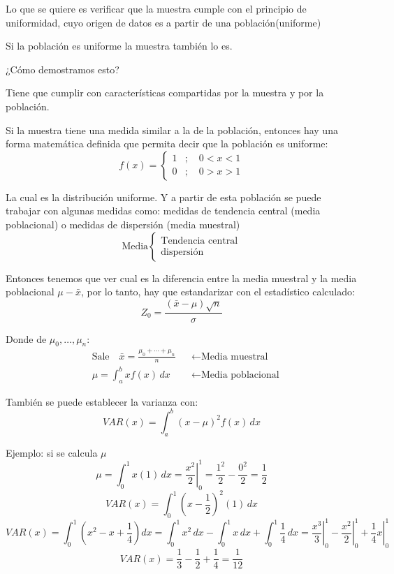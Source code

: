 \documentclass[11pt,letterpaper]{report}
\begin{document}
Lo que se quiere es verificar que la muestra cumple con el principio de uniformidad, cuyo origen de datos es a partir de una población(uniforme)

Si la población es uniforme la muestra también lo es.

¿Cómo demostramos esto?

Tiene que cumplir con características compartidas por la muestra y por la población.

\begin{center}
\end{center}

Si la muestra tiene una medida similar a la de la población, entonces hay una forma matemática definida que permita decir que la población es uniforme:
\[
f(x) = \begin{cases}
1 & ;\quad 0 < x < 1\\
0 & ;\quad 0 > x > 1
\end{cases}
\]

La cual es la distribución uniforme. Y a partir de esta población se puede trabajar con algunas medidas como: medidas de tendencia central (media poblacional) o medidas de dispersión (media muestral)
\[
\text{Media}
\begin{cases}
\text{Tendencia central}\\
\text{dispersión}
\end{cases}
\]

Entonces tenemos que ver cual es la diferencia entre la media muestral y la media poblacional $\mu - \bar{x}$, por lo tanto, hay que estandarizar con el estadístico calculado:
\[
Z_0 = \frac{(\bar{x} - \mu)\sqrt{n}}{\sigma}
\]

Donde de $\mu_0, \ldots, \mu_n$:
\begin{align*}
&\text{Sale}\quad \bar{x} = \frac{\mu_0 + \cdots + \mu_n}{n} &&\leftarrow \text{Media muestral}\\
&\mu = \int_a^b x f(x)\,dx &&\leftarrow \text{Media poblacional}
\end{align*}

También se puede establecer la varianza con:
\[
VAR(x) = \int_a^b (x - \mu)^2 f(x)\,dx
\]

Ejemplo: si se calcula $\mu$
\[
\mu = \int_0^1 x(1)\,dx = \left.\frac{x^2}{2}\right|_0^1 = \frac{1^2}{2} - \frac{0^2}{2} = \frac{1}{2}
\]
\[
VAR(x) = \int_0^1 \left(x - \frac{1}{2}\right)^2 (1)\,dx
\]
\[
VAR(x) = \int_0^1 \left(x^2 - x + \frac{1}{4}\right)dx = \int_0^1 x^2\,dx - \int_0^1 x\,dx + \int_0^1 \frac{1}{4}\,dx = \left.\frac{x^3}{3}\right|_0^1 - \left.\frac{x^2}{2}\right|_0^1 + \left.\frac{1}{4}x\right|_0^1
\]
\[
VAR(x) = \frac{1}{3} - \frac{1}{2} + \frac{1}{4} = \frac{1}{12}
\]
\end{document}
